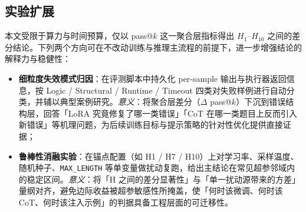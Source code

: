 \subsection{实验扩展}
本文受限于算力与时间预算，仅以 pass@$k$ 这一聚合层指标得出 $H_1$--$H_{10}$ 之间的差分结论。下列两个方向可在不改动训练与推理主流程的前提下，进一步增强结论的解释力与稳健性：
\begin{itemize}
    \item \textbf{细粒度失效模式归因}：在评测脚本中持久化 per-sample 输出与执行器返回信息，按 Logic / Structural / Runtime / Timeout 四类对失败样例进行自动分类，并辅以典型案例研究。\textit{意义}：将聚合层差分（$\Delta$ pass@$k$）下沉到错误结构层，回答「LoRA 究竟修复了哪一类错误」「CoT 在哪一类题目上反而引入新错误」等机理问题，为后续训练目标与提示策略的针对性优化提供直接证据；
    \item \textbf{鲁棒性消融实验}：在锚点配置（如 H1 / H7 / H10）上对学习率、采样温度、随机种子、\texttt{MAX\_LENGTH} 等单变量做扰动复跑，给出主结论在常见超参邻域内的稳定区间。\textit{意义}：将「H 之间的差分显著性」与「单一扰动源带来的方差」量纲对齐，避免边际收益被超参敏感性所掩盖，使「何时该微调、何时该 CoT、何时该注入示例」的判据具备工程层面的可迁移性。
\end{itemize}
